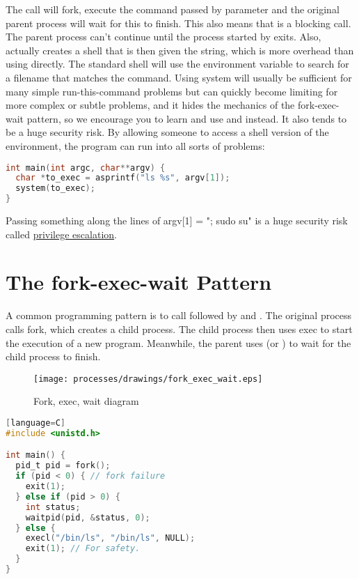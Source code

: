 The  call will fork, execute the command passed by parameter and the original parent process will wait for this to finish.
This also means that  is a blocking call.
The parent process can't continue until the process started by  exits.
Also,  actually creates a shell that is then given the string, which is more overhead than using  directly.
The standard shell will use the  environment variable to search for a filename that matches the command.
Using system will usually be sufficient for many simple run-this-command problems but can quickly become limiting for more complex or subtle problems, and it hides the mechanics of the fork-exec-wait pattern, so we encourage you to learn and use   and  instead.
It also tends to be a huge security risk.
By allowing someone to access a shell version of the environment, the program can run into all sorts of problems:

\begin{lstlisting}[language=C]
int main(int argc, char**argv) {
  char *to_exec = asprintf("ls %s", argv[1]);
  system(to_exec);
}
\end{lstlisting}

Passing something along the lines of argv[1] = "; sudo su" is a huge security risk called \href{https://en.wikipedia.org/wiki/Privilege\_escalation}{privilege escalation}.

\section{The fork-exec-wait Pattern}

A common programming pattern is to call  followed by  and .
The original process calls fork, which creates a child process.
The child process then uses exec to start the execution of a new program.
Meanwhile, the parent uses  (or ) to wait for the child process to finish.

\begin{figure}[H]
\centering
\texttt{[image: processes/drawings/fork\_exec\_wait.eps]}
\caption{Fork, exec, wait diagram}
\end{figure}

\begin{lstlisting}[language=C][language=C]
#include <unistd.h>

int main() {
  pid_t pid = fork();
  if (pid < 0) { // fork failure
    exit(1);
  } else if (pid > 0) {
    int status;
    waitpid(pid, &status, 0);
  } else {
    execl("/bin/ls", "/bin/ls", NULL);
    exit(1); // For safety.
  }
}
\end{lstlisting}

